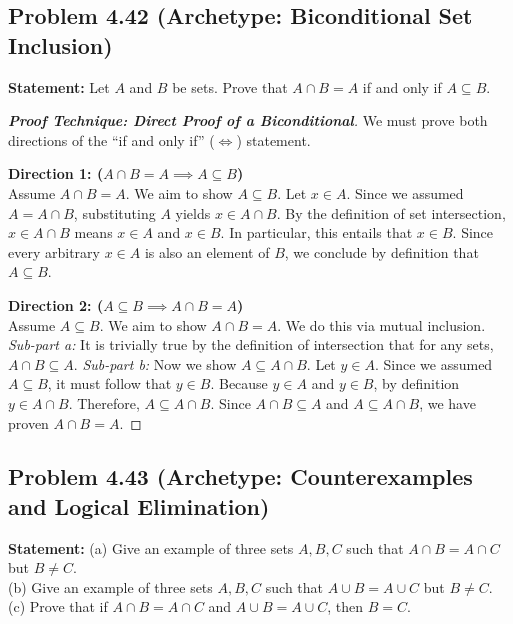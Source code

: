 \documentclass[11pt]{article}
\begin{document}
\subsection{Problem 4.42 (Archetype: Biconditional Set Inclusion)}
\textbf{Statement:} Let $A$ and $B$ be sets. Prove that $A \cap B = A$ if and only if $A \subseteq B$.

\begin{proof}[\textbf{Proof Technique: Direct Proof of a Biconditional}]
We must prove both directions of the ``if and only if'' ($\iff$) statement.

\textbf{Direction 1: ($A \cap B = A \implies A \subseteq B$)} \\
Assume $A \cap B = A$. We aim to show $A \subseteq B$.
Let $x \in A$. Since we assumed $A = A \cap B$, substituting $A$ yields $x \in A \cap B$.
By the definition of set intersection, $x \in A \cap B$ means $x \in A$ and $x \in B$.
In particular, this entails that $x \in B$.
Since every arbitrary $x \in A$ is also an element of $B$, we conclude by definition that $A \subseteq B$.

\textbf{Direction 2: ($A \subseteq B \implies A \cap B = A$)} \\
Assume $A \subseteq B$. We aim to show $A \cap B = A$. We do this via mutual inclusion.
\textit{Sub-part a:} It is trivially true by the definition of intersection that for any sets, $A \cap B \subseteq A$. 
\textit{Sub-part b:} Now we show $A \subseteq A \cap B$. Let $y \in A$. Since we assumed $A \subseteq B$, it must follow that $y \in B$. Because $y \in A$ and $y \in B$, by definition $y \in A \cap B$. Therefore, $A \subseteq A \cap B$.
Since $A \cap B \subseteq A$ and $A \subseteq A \cap B$, we have proven $A \cap B = A$.
\end{proof}

\subsection{Problem 4.43 (Archetype: Counterexamples and Logical Elimination)}
\textbf{Statement:} 
(a) Give an example of three sets $A, B, C$ such that $A \cap B = A \cap C$ but $B \neq C$. \\
(b) Give an example of three sets $A, B, C$ such that $A \cup B = A \cup C$ but $B \neq C$. \\
(c) Prove that if $A \cap B = A \cap C$ and $A \cup B = A \cup C$, then $B = C$.
\end{document}
